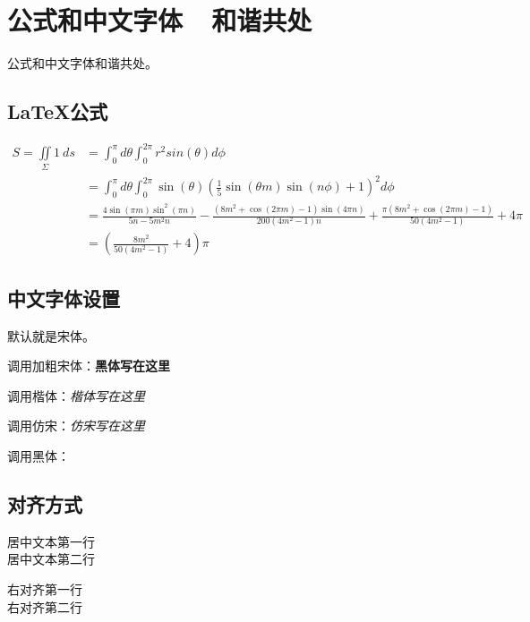 \section{公式和中文字体\ \ 和谐共处}

公式和中文字体和谐共处。

\subsection{LaTeX公式}

\begin{align*}
S=\iint\limits_{\Sigma}1 \ ds &= \int_0^{\pi}d\theta \int_0^{2\pi} r^2sin(\theta) d\phi \\
&= \int_0^{\pi}d\theta \int_0^{2\pi}\sin (\theta ) \left(\frac{1}{5} \sin (\theta  m) \sin (n \phi )+1\right)^2d\phi\\
&=\frac{4 \sin (\pi  m) \sin ^2(\pi  n)}{5 n-5 m^2 n}-\frac{\left(8 m^2+\cos (2 \pi  m)-1\right) \sin (4 \pi  n)}{200 \left(4 m^2-1\right) n}+\frac{\pi  \left(8 m^2+\cos (2 \pi  m)-1\right)}{50 \left(4 m^2-1\right)}+4 \pi\\
&=  \left(\frac{8 m^2}{50 \left(4 m^2-1\right)}+4\right)\pi
\end{align*}

\subsection{中文字体设置}

默认就是宋体。

调用加粗宋体：\textbf{黑体写在这里}

调用楷体：\textit{楷体写在这里}

调用仿宋：\textsl{仿宋写在这里}

调用黑体：

\subsection{对齐方式}


\begin{center} 
居中文本第一行\\
居中文本第二行\\
\end{center}

\begin{flushright}
右对齐第一行\\
右对齐第二行\\
\end{flushright}

